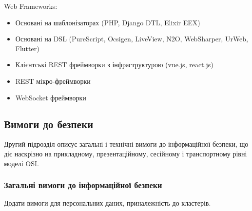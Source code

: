\documentclass{article}
\begin{document}
Web Frameworks:

\begin{itemize}
  \item Основані на шаблонізаторах (PHP, Django DTL, Elixir EEX)
  \item Основані на DSL (PureScript, Ocsigen, LiveView, N2O, WebSharper, UrWeb, Flutter)
  \item Клієнтські REST фреймворки з інфраструктурою (vue.js, react.js)
  \item REST мікро-фреймворки
  \item WebSocket фреймворки
\end{itemize}

\newpage

\subsection{Вимоги до безпеки}

Другий підрозділ описує загальні і технічні вимоги до інформаційної безпеки, що діє наскрізно на прикладному,
презентаційному, сесійному і транспортному рівні моделі OSI.

\subsubsection{Загальні вимоги до інформаційної безпеки}

Додати вимоги для персональних даних, приналежність до кластерів.
\end{document}

